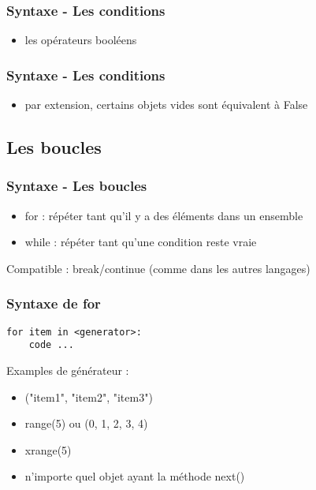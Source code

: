 \begin{frame}[fragile]
  \frametitle{Syntaxe - Les conditions}
  \begin{itemize}
    \item les opérateurs booléens
  \end{itemize}
  \begin{ipython}
  \end{ipython}
\end{frame}

\begin{frame}[fragile]
  \frametitle{Syntaxe - Les conditions}
  \begin{itemize}
    \item par extension, certains objets vides sont équivalent à False
  \end{itemize}
  \begin{ipython}
  \end{ipython}
\end{frame}

\subsection{Les boucles}
\begin{frame}[fragile]
  \frametitle{Syntaxe - Les boucles}
  \begin{itemize}
    \item for : répéter tant qu'il y a des éléments dans un ensemble
    \item while : répéter tant qu'une condition reste vraie
  \end{itemize}

  Compatible : break/continue (comme dans les autres langages)
\end{frame}

\begin{frame}[fragile]
  \frametitle{Syntaxe de for}
  \begin{lstlisting}
for item in <generator>:
    code ...
  \end{lstlisting}
Examples de générateur :
  \begin{itemize}
  \item ("item1", "item2", "item3")
  \item range(5) ou (0, 1, 2, 3, 4)
  \item xrange(5)
  \item n'importe quel objet ayant la méthode next()
  \end{itemize}
\end{frame}

